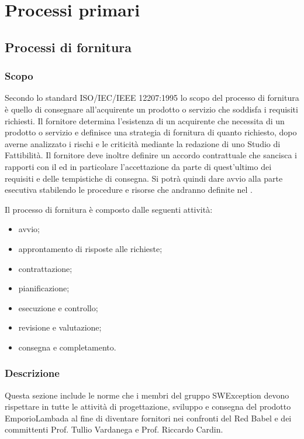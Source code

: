 \section{Processi primari}

\subsection{Processi di fornitura}
\label{_processiDiFornitura}
\subsubsection{Scopo}
Secondo lo standard ISO/IEC/IEEE 12207:1995 lo scopo del processo di fornitura è quello di consegnare all'acquirente un prodotto o servizio che soddisfa i requisiti richiesti. Il fornitore determina l'esistenza di un acquirente che necessita di un prodotto o servizio e definisce una strategia di fornitura di quanto richiesto, dopo averne analizzato i rischi e le criticità mediante la redazione di uno Studio di Fattibilità.
Il fornitore deve inoltre definire un accordo contrattuale che sancisca i rapporti con il  ed in particolare l'accettazione da parte di quest'ultimo dei requisiti e delle tempistiche di consegna. Si potrà quindi dare avvio alla parte esecutiva stabilendo le procedure e risorse che andranno definite nel .

Il processo di fornitura è composto dalle seguenti attività:
\begin{itemize}
  \item avvio;
  \item approntamento di risposte alle richieste;
  \item contrattazione;
  \item pianificazione;
  \item esecuzione e controllo;
  \item revisione e valutazione;
  \item consegna e completamento.
\end{itemize}

\subsubsection{Descrizione}
Questa sezione include le norme che i membri del gruppo SWException devono rispettare in tutte le attività di progettazione, sviluppo e consegna del prodotto EmporioLambada al fine di diventare fornitori nei confronti del  Red Babel e dei committenti Prof. Tullio Vardanega e Prof. Riccardo Cardin.
